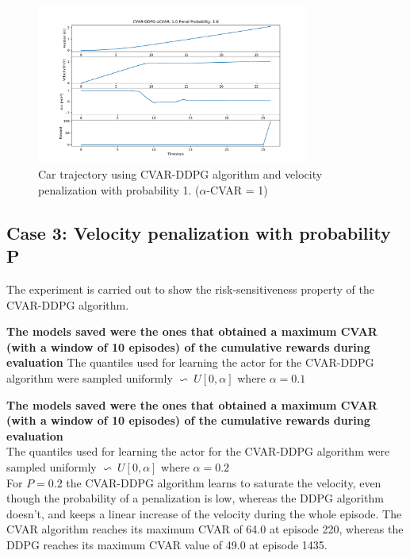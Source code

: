 \begin{figure}[ht]
        \centering
        \includegraphics[width=0.8\textwidth]{images/Car/CVAR/Trajectory_CVAR_ppenal1.pdf}
        \caption{Car trajectory using CVAR-DDPG algorithm and velocity penalization with probability 1. ($\alpha$-CVAR = 1)}
        \label{traj_cvarddpg_probpenal1_cvar1}
    
\end{figure}

\newpage
\subsection{Case 3: Velocity penalization with probability P }
The experiment is carried out to show the risk-sensitiveness property of the CVAR-DDPG algorithm.

\textbf{The models saved were the ones that obtained a maximum CVAR (with a window of 
10 episodes) of the cumulative rewards during evaluation}
The quantiles used for learning the actor for the CVAR-DDPG algorithm were sampled
uniformly $\backsim\ U[0,\alpha] $ where $\alpha=0.1$


\textbf{The models saved were the ones that obtained a maximum CVAR (with a window of 10 episodes) of the cumulative rewards during evaluation}\\

The quantiles used for learning the actor for the CVAR-DDPG algorithm were sampled uniformly $\backsim\ U[0,\alpha] $ where $\alpha=0.2$\\


For $P=0.2$ the CVAR-DDPG algorithm learns to saturate the velocity, even though the
probability of a penalization is low, whereas the DDPG algorithm doesn't, and keeps a
linear increase of the velocity during the whole episode.
The CVAR algorithm reaches its maximum CVAR of 64.0 at episode 220, whereas the DDPG
reaches its maximum CVAR value of 49.0 at episode 1435.

